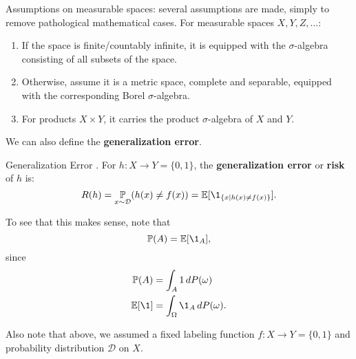 \documentclass{article}
\begin{document}
Assumptions on measurable spaces: several assumptions are made, simply to remove pathological mathematical cases. For measurable spaces $X, Y, Z, \dots$:
\begin{enumerate}
\item If the space is finite/countably infinite, it is equipped with the $\sigma$-algebra consisting of all subsets of the space.
\item Otherwise, assume it is a metric space, complete and separable, equipped with the corresponding Borel $\sigma$-algebra.
\item For products $X \times Y$, it carries the product $\sigma$-algebra of $X$ and $Y$. 
\end{enumerate}

We can also define the \textbf{generalization error}.

\begin{Definition}{Generalization Error}
. For $h : X \rightarrow Y = \{ 0 , 1 \}$, the \textbf{generalization error} or \textbf{risk} of $h$ is:
\begin{equation}
  R(h) = \underset{x \sim \mathcal{D}}{\bP} (h(x) \neq f(x)) = \bE [ \1_{\{x | h(x) \neq f(x) \} } ].
\end{equation}
\end{Definition}

To see that this makes sense, note that 
\begin{equation}
\label{eq:1}
  \bP (A) = \bE[\1_A],
\end{equation}
since
\begin{align}
\label{eq:2}
  \bP (A) &= \int_A 1 \, dP(\omega) \\
  \bE [\1] &= \int_{\Omega} \1_A \, dP(\omega).
\end{align}

Also note that above, we assumed a fixed labeling function $f: X \rightarrow Y = \{ 0 , 1 \}$ and probability distribution $\mathcal{D}$ on $X$.

\printindex
\end{document}
